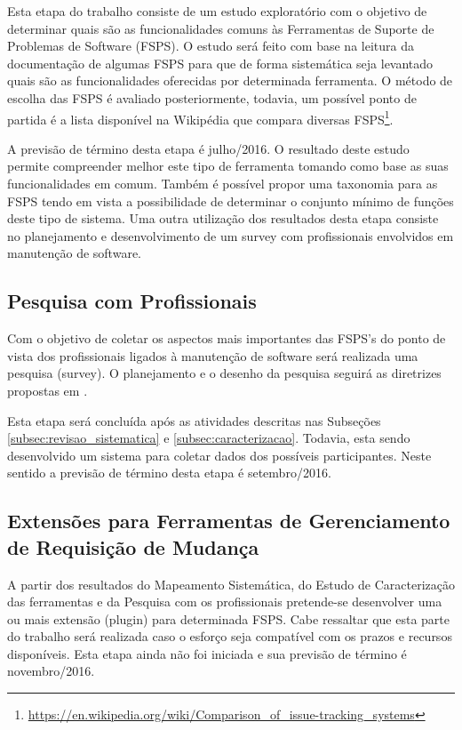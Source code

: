 \documentclass[10pt,a4paper]{report}
\begin{document}
Esta etapa do trabalho consiste de um estudo exploratório com o objetivo de determinar quais são as funcionalidades comuns às  Ferramentas de Suporte de Problemas de Software (FSPS). O estudo será feito com base na leitura da documentação de algumas FSPS para que de forma sistemática seja levantado quais são as funcionalidades oferecidas por determinada ferramenta. O método de escolha das FSPS é avaliado posteriormente, todavia, um possível ponto de partida é a lista disponível na Wikipédia que compara diversas FSPS\footnote{\url{https://en.wikipedia.org/wiki/Comparison_of_issue-tracking_systems}}.

A previsão de término desta etapa é julho/2016. O resultado deste estudo permite compreender melhor este tipo de ferramenta tomando como base as suas funcionalidades em comum. Também é possível propor  uma taxonomia para as FSPS tendo em vista a possibilidade de determinar o conjunto mínimo de funções deste tipo de sistema. Uma outra utilização dos resultados desta etapa consiste no planejamento e desenvolvimento de um survey com profissionais envolvidos em manutenção de software.

\subsection{Pesquisa com Profissionais}
\label{subsec:survey}
Com o objetivo de coletar os aspectos mais importantes das FSPS's do ponto de
vista dos profissionais ligados à manutenção de software será realizada uma
pesquisa (survey). O planejamento e o desenho da pesquisa seguirá as diretrizes propostas em \cite{wohlin2012experimentation}.

Esta etapa será concluída após as atividades descritas nas Subseções \ref{subsec:revisao_sistematica} e \ref{subsec:caracterizacao}. Todavia, esta sendo desenvolvido um sistema para coletar dados dos possíveis participantes. Neste sentido a previsão de término desta etapa é setembro/2016.

\subsection{Extensões para Ferramentas de Gerenciamento de Requisição de Mudança}
\label{subsec:novas-extensoes}

A partir dos resultados do Mapeamento Sistemática, do Estudo de Caracterização das ferramentas e da Pesquisa com os profissionais pretende-se desenvolver uma ou mais extensão (plugin) para determinada FSPS. Cabe ressaltar que esta parte do trabalho será realizada caso o esforço seja compatível com os prazos e recursos disponíveis. Esta etapa ainda não foi iniciada e sua previsão de término é novembro/2016.
\end{document}
